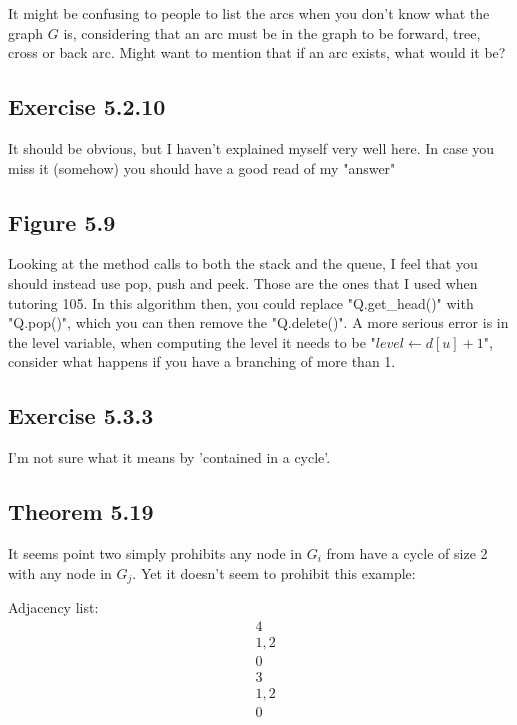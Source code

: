 \documentclass{article}
\begin{document}
It might be confusing to people to list the arcs when you don't know what the graph \(G\) is, considering that an arc must be in the graph to be forward, tree, cross or back arc. Might want to mention that if an arc exists, what would it be?


\subsection*{Exercise 5.2.10}

It should be obvious, but I haven't explained myself very well here. In case you miss it (somehow) you should have a good read of my "answer"


\subsection*{Figure 5.9}

Looking at the method calls to both the stack and the queue, I feel that you should instead use pop, push and peek. Those are the ones that I used when tutoring 105. In this algorithm then, you could replace "Q.get\_head()" with "Q.pop()", which you can then remove the "Q.delete()". A more serious error is in the level variable, when computing the level it needs to be "\(level \leftarrow d[u]+1\)", consider what happens if you have a branching of more than 1.


\subsection*{Exercise 5.3.3}

I'm not sure what it means by 'contained in a cycle'.


\subsection*{Theorem 5.19}

It seems point two simply prohibits any node in \(G_i\) from have a cycle of size 2 with any node in \(G_j\). Yet it doesn't seem to prohibit this example:

Adjacency list:
\begin{align*}
&4 \\
&1,2 \\
&0 \\
&3 \\
&1,2 \\
&0 \\
\end{align*}
\end{document}

